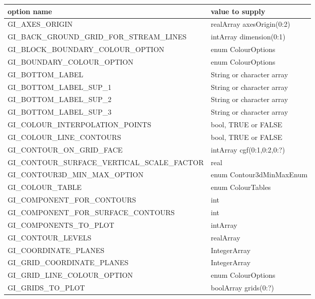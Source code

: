 \documentclass{article}
\begin{document}
\begin{supertabular}{|l|l|}
\hline
 option name  &      value to supply \\
\hline
 GI\_AXES\_ORIGIN                           &  realArray axesOrigin(0:2) \\
 GI\_BACK\_GROUND\_GRID\_FOR\_STREAM\_LINES &  intArray dimension(0:1)  \\
 GI\_BLOCK\_BOUNDARY\_COLOUR\_OPTION               & enum ColourOptions \\
 GI\_BOUNDARY\_COLOUR\_OPTION               & enum ColourOptions \\
 GI\_BOTTOM\_LABEL                               &  String or character array   \\
 GI\_BOTTOM\_LABEL\_SUP\_1                       &  String or character array   \\
 GI\_BOTTOM\_LABEL\_SUP\_2                       &  String or character array   \\
 GI\_BOTTOM\_LABEL\_SUP\_3                       &  String or character array   \\
 GI\_COLOUR\_INTERPOLATION\_POINTS               &  bool, TRUE or FALSE  \\
 GI\_COLOUR\_LINE\_CONTOURS                      &  bool, TRUE or FALSE  \\
 GI\_CONTOUR\_ON\_GRID\_FACE                     & intArray cgf(0:1,0:2,0:?) \\
 GI\_CONTOUR\_SURFACE\_VERTICAL\_SCALE\_FACTOR   & real \\
 GI\_CONTOUR3D\_MIN\_MAX\_OPTION                & enum Contour3dMinMaxEnum \\
 GI\_COLOUR\_TABLE                          &  enum ColourTables \\
 GI\_COMPONENT\_FOR\_CONTOURS               &  int   \\
 GI\_COMPONENT\_FOR\_SURFACE\_CONTOURS      &  int   \\
 GI\_COMPONENTS\_TO\_PLOT                   &  intArray \\
 GI\_CONTOUR\_LEVELS                        &  realArray \\
 GI\_COORDINATE\_PLANES                     &  IntegerArray \\
 GI\_GRID\_COORDINATE\_PLANES                     &  IntegerArray \\
 GI\_GRID\_LINE\_COLOUR\_OPTION             & enum ColourOptions \\
 GI\_GRIDS\_TO\_PLOT                        &  boolArray grids(0:?)  \\

\end{supertabular}
\end{document}
